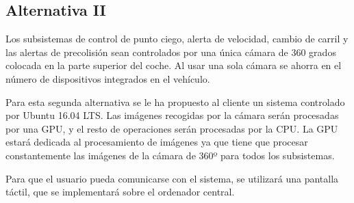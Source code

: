\subsection{Alternativa II}

\par Los subsistemas de control de punto ciego, alerta de velocidad, cambio de carril y las alertas de precolisión sean controlados por una única cámara de 360 grados colocada en la parte superior del coche. Al usar una sola cámara se ahorra en el número de dispositivos integrados en el vehículo.

\par Para esta segunda alternativa se le ha propuesto al cliente un sistema controlado por Ubuntu 16.04 LTS. Las imágenes recogidas por la cámara serán procesadas por una GPU, y el resto de operaciones serán procesadas por la CPU. La GPU estará dedicada al procesamiento de imágenes ya que tiene que procesar constantemente las imágenes de la cámara de 360º para todos los subsistemas.

\par Para que el usuario pueda comunicarse con el sistema, se utilizará una pantalla táctil, que se implementará sobre el ordenador central.

